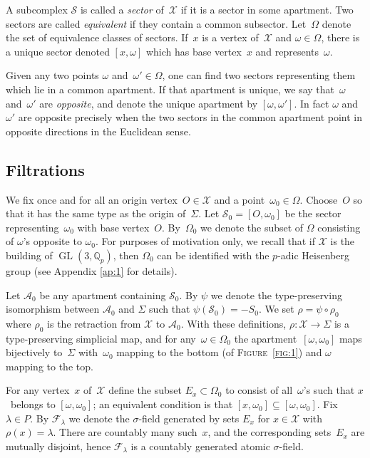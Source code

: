 \documentclass[a4paper]{amsart}
\newcommand{\defn}[1]{\emph{#1}}
\newcommand{\GL}{\operatorname{GL}}
\newcommand{\QQ}{\mathbb{Q}}
\theoremstyle{plain}
\theoremstyle{definition}
\theoremstyle{remark}
\numberwithin{equation}{section}
\theoremstyle{plain}
\begin{document}
A subcomplex $\mathscr{S}$
is called a \defn{sector} of~$\mathscr{X}$ if it is a sector in some
apartment.  Two sectors are called \defn{equivalent} if they contain a
common subsector.  Let~$\Omega$ denote the set of equivalence classes
of sectors.  If~$x$ is a vertex of~$\mathscr{X}$ and
$\omega\in\Omega$, there is a unique sector denoted $[x,\omega]$ which
has base vertex~$x$ and represents~$\omega$.

Given any two points $\omega$ and~$\omega' \in \Omega$, one can find
two sectors representing them which lie in a common apartment. If that
apartment is unique, we say that~$\omega$ and~$\omega'$ are
\defn{opposite}, and denote the unique apartment by
$[\omega,\omega']$.  In fact $\omega$ and~$\omega'$ are opposite
precisely when the two sectors in the common apartment point in
opposite directions in the Euclidean sense.

\subsection{Filtrations}
We fix once and for all an origin vertex~$O \in \mathscr{X}$ and a
point~$\omega_0 \in \Omega$.  Choose~$O$ so that it has the same type
as the origin of~$\Sigma$. Let $\mathscr{S}_0=[O,\omega_0]$ be the
sector representing~$\omega_0$ with base vertex~$O$. By~$\Omega_0$ we
denote the subset of $\Omega$ consisting of $\omega$'s opposite to
$\omega_0$.  For purposes of motivation only, we recall that if
$\mathscr{X}$ is the building of $\GL(3,\QQ_p)$, then $\Omega_0$ can
be identified with the $p$-adic Heisenberg group (see Appendix \ref{ap:1} for details).

Let $\mathscr{A}_0$ be any apartment containing $\mathscr{S}_0$.  By
$\psi$ we denote the type-preserving isomorphism between $\mathscr{A}_0$ and $\Sigma$
such that $\psi(\mathscr{S}_0) = -S_0$. We set $\rho = \psi \circ
\rho_0$ where $\rho_0$ is the retraction from $\mathscr{X}$ to
$\mathscr{A}_0$.  With these definitions, $\rho:\mathscr{X}\to\Sigma$
is a type-preserving simplicial map, and for any~$\omega\in\Omega_0$
the apartment~$[\omega,\omega_0]$ maps bijectively to~$\Sigma$
with~$\omega_0$ mapping to the bottom (of \textsc{Figure~\ref{fig:1}})
and $\omega$ mapping to the top.

For any vertex~$x$ of~$\mathscr{X}$ define the subset $E_x \subset
\Omega_0$ to consist of all~$\omega$'s such that $x$~belongs to
$[\omega, \omega_0]$; an equivalent condition is that
$[x,\omega_0]\subseteq[\omega,\omega_0]$.  Fix $\lambda \in P$.  By
$\mathcal{F}_\lambda$ we denote the $\sigma$-field generated by sets
$E_x$ for $x \in \mathscr{X}$ with $\rho(x) = \lambda$. There are
countably many such~$x$, and the corresponding sets~$E_x$ are mutually
disjoint, hence $\mathcal{F}_\lambda$ is a countably generated atomic
$\sigma$-field.
\end{document}
